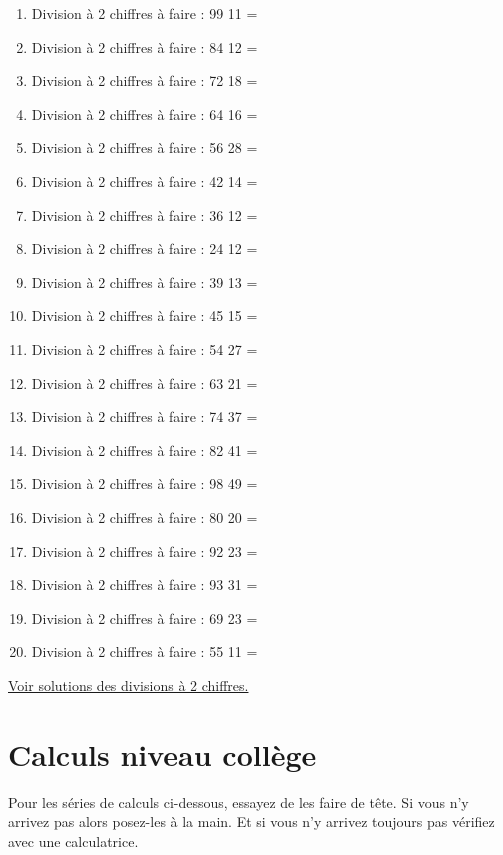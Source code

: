 \documentclass[11pt]{article}
\begin{document}
\begin{enumerate}
\item Division à 2 chiffres à faire :  99 \textdiv{} 11 =
\item Division à 2 chiffres à faire :  84 \textdiv{} 12 =
\item Division à 2 chiffres à faire :  72 \textdiv{} 18 =
\item Division à 2 chiffres à faire :  64 \textdiv{} 16 =
\item Division à 2 chiffres à faire :  56 \textdiv{} 28 =
\item Division à 2 chiffres à faire :  42 \textdiv{} 14 =
\item Division à 2 chiffres à faire :  36 \textdiv{} 12 =
\item Division à 2 chiffres à faire :  24 \textdiv{} 12 =
\item Division à 2 chiffres à faire :  39 \textdiv{} 13 =
\item Division à 2 chiffres à faire :  45 \textdiv{} 15 =
\item Division à 2 chiffres à faire :  54 \textdiv{} 27 =
\item Division à 2 chiffres à faire :  63 \textdiv{} 21 =
\item Division à 2 chiffres à faire :  74 \textdiv{} 37 =
\item Division à 2 chiffres à faire :  82 \textdiv{} 41 =
\item Division à 2 chiffres à faire :  98 \textdiv{} 49 =
\item Division à 2 chiffres à faire :  80 \textdiv{} 20 =
\item Division à 2 chiffres à faire :  92 \textdiv{} 23 =
\item Division à 2 chiffres à faire :  93 \textdiv{} 31 =
\item Division à 2 chiffres à faire :  69 \textdiv{} 23 =
\item Division à 2 chiffres à faire :  55 \textdiv{} 11 =
\end{enumerate}

\hyperref[orgd3dd92e]{Voir solutions des divisions à 2 chiffres.}



\newpage


\section{Calculs niveau collège}
\label{sec:orgd1bef54}

Pour les séries de calculs ci-dessous, essayez de les faire de
tête. Si vous n'y arrivez pas alors posez-les à la main. Et si vous
n'y arrivez toujours pas vérifiez avec une calculatrice.
\end{document}
